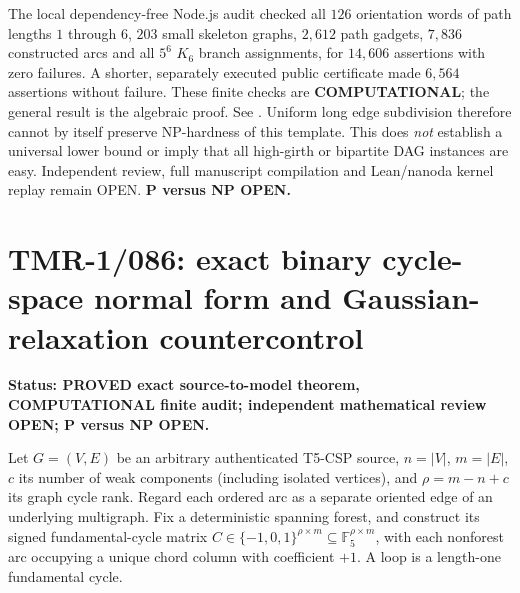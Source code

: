 \documentclass[11pt]{article}
\begin{document}
The local dependency-free Node.js audit checked all \(126\)
orientation words of path lengths \(1\) through \(6\), \(203\)
small skeleton graphs, \(2{,}612\) path gadgets, \(7{,}836\)
constructed arcs and all \(5^6\) \(K_6\) branch assignments,
for \(14{,}606\) assertions with zero failures. A shorter,
separately executed public certificate made \(6{,}564\)
assertions without failure. These finite checks are
\textbf{COMPUTATIONAL}; the general result is the algebraic proof.
See .
Uniform long edge subdivision therefore cannot by itself
preserve NP-hardness of this template. This does \emph{not}
establish a universal lower bound or imply that all high-girth
or bipartite DAG instances are easy. Independent review,
full manuscript compilation and Lean/nanoda kernel replay remain
OPEN. \textbf{P versus NP OPEN.}




\section{TMR-1/086: exact binary cycle-space normal form and Gaussian-relaxation countercontrol}
\noindent\textbf{Status: PROVED exact source-to-model theorem, COMPUTATIONAL finite audit; independent mathematical review OPEN; P versus NP OPEN.}

Let $G=(V,E)$ be an arbitrary authenticated T5-CSP source,
$n=|V|$, $m=|E|$, $c$ its number of weak components (including
isolated vertices), and $\rho=m-n+c$ its graph cycle rank.  Regard
each ordered arc as a separate oriented edge of an underlying
multigraph.  Fix a deterministic spanning forest, and construct
its signed fundamental-cycle matrix
$C\in\{-1,0,1\}^{\rho\times m}\subseteq\mathbb F_5^{\rho\times m}$,
with each nonforest arc occupying a unique chord column with coefficient
$+1$. A loop is a length-one fundamental cycle.
\end{document}

